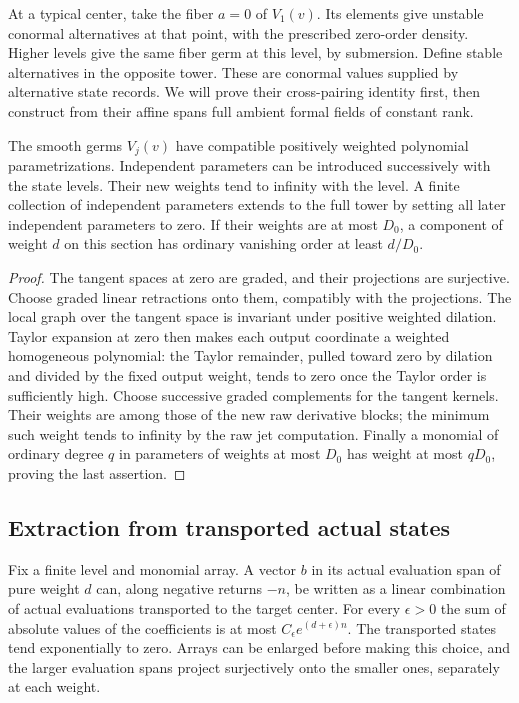 At a typical center, take the fiber $a=0$ of $V_1(v)$. Its elements give
unstable conormal alternatives at that point, with the prescribed
zero-order density. Higher levels give the same fiber germ at this
level, by submersion. Define stable alternatives in the opposite tower.
These are conormal values supplied by alternative state records. We
will prove their cross-pairing identity first, then construct from their
affine spans full ambient formal fields of constant rank.

\begin{lemma}\label{hull:parameters}
The smooth germs $V_j(v)$ have compatible positively weighted
polynomial parametrizations. Independent parameters can be introduced
successively with the state levels. Their new weights tend to infinity
with the level. A finite collection of independent parameters extends
to the full tower by setting all later independent parameters to zero.
If their weights are at most $D_0$, a component of weight $d$ on this
section has ordinary vanishing order at least $d/D_0$.
\end{lemma}

\begin{proof}
The tangent spaces at zero are graded, and their projections are
surjective. Choose graded linear retractions onto them, compatibly with
the projections. The local graph over the tangent space is invariant
under positive weighted dilation. Taylor expansion at zero then makes
each output coordinate a weighted homogeneous polynomial: the Taylor
remainder, pulled toward zero by dilation and divided by the fixed
output weight, tends to zero once the Taylor order is sufficiently high.
Choose successive graded complements for the tangent kernels. Their
weights are among those of the new raw derivative blocks; the minimum
such weight tends to infinity by the raw jet computation. Finally a
monomial of ordinary degree $q$ in parameters of weights at most $D_0$
has weight at most $qD_0$, proving the last assertion.
\end{proof}

\subsection{Extraction from transported actual states}

\begin{lemma}\label{hull:evaluation}
Fix a finite level and monomial array. A vector $b$ in its actual
evaluation span of pure weight $d$ can, along negative returns $-n$,
be written as a linear combination of actual evaluations transported
to the target center. For every $\epsilon>0$ the sum of absolute values
of the coefficients is at most
$C_\epsilon e^{(d+\epsilon)n}$. The transported states tend
exponentially to zero. Arrays can be enlarged before making this choice,
and the larger evaluation spans project surjectively onto the smaller
ones, separately at each weight.
\end{lemma}

